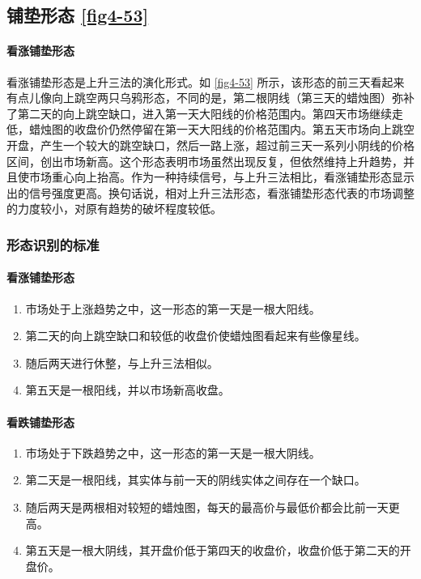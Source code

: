 \subsection{铺垫形态 \autoref{fig4-53}}
\paragraph{看涨铺垫形态} 看涨铺垫形态是上升三法的演化形式。如 \autoref{fig4-53} 所示，该形态的前三天看起来有点儿像向上跳空两只乌鸦形态，不同的是，第二根阴线（第三天的蜡烛图）弥补了第二天的向上跳空缺口，进入第一天大阳线的价格范围内。第四天市场继续走低，蜡烛图的收盘价仍然停留在第一天大阳线的价格范围内。第五天市场向上跳空开盘，产生一个较大的跳空缺口，然后一路上涨，超过前三天一系列小阴线的价格区间，创出市场新高。这个形态表明市场虽然出现反复，但依然维持上升趋势，并且使市场重心向上抬高。作为一种持续信号，与上升三法相比，看涨铺垫形态显示出的信号强度更高。换句话说，相对上升三法形态，看涨铺垫形态代表的市场调整的力度较小，对原有趋势的破坏程度较低。


\subsubsection*{形态识别的标准}
\paragraph{看涨铺垫形态}
\begin{enumerate}
    \item 市场处于上涨趋势之中，这一形态的第一天是一根大阳线。
    \item 第二天的向上跳空缺口和较低的收盘价使蜡烛图看起来有些像星线。
    \item 随后两天进行休整，与上升三法相似。
    \item 第五天是一根阳线，并以市场新高收盘。
\end{enumerate}
\paragraph{看跌铺垫形态}
\begin{enumerate}
    \item 市场处于下跌趋势之中，这一形态的第一天是一根大阴线。
    \item 第二天是一根阳线，其实体与前一天的阴线实体之间存在一个缺口。
    \item 随后两天是两根相对较短的蜡烛图，每天的最高价与最低价都会比前一天更高。
    \item 第五天是一根大阴线，其开盘价低于第四天的收盘价，收盘价低于第二天的开盘价。
\end{enumerate}

